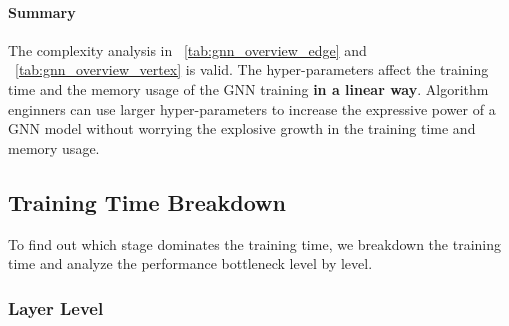 \paragraph{Summary}

The complexity analysis in \tablename~\ref{tab:gnn_overview_edge} and \tablename~\ref{tab:gnn_overview_vertex} is valid.
The hyper-parameters affect the training time and the memory usage of the GNN training \textbf{in a linear way}.
Algorithm enginners can use larger hyper-parameters to increase the expressive power of a GNN model without worrying the explosive growth in the training time and memory usage.

\subsection{Training Time Breakdown}
\label{sec:training_time_breakdown}

To find out which stage dominates the training time, we breakdown the training time and analyze the performance bottleneck level by level.

\subsubsection{Layer Level}

